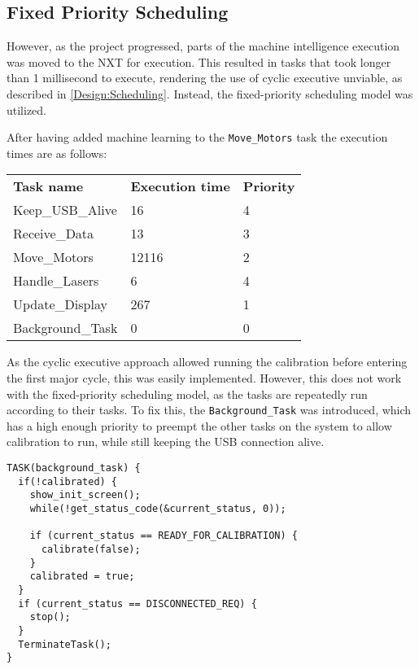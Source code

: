 \subsection{Fixed Priority Scheduling}
However, as the project progressed, parts of the machine intelligence execution was moved to the NXT for execution.
This resulted in tasks that took longer than 1 millisecond to execute, rendering the use of cyclic executive unviable, as described in \autoref{Design:Scheduling}.
Instead, the fixed-priority scheduling model was utilized.

After having added machine learning to the \texttt{Move\_Motors} task the execution times are as follows:

\begin{table}[H]
\begin{tabular}{lll}
\textbf{Task name}  & \textbf{Execution time} 	& \textbf{Priority}\\
Keep\_USB\_Alive    & 16                        & 4   \\
Receive\_Data       & 13                        & 3   \\
Move\_Motors        & 12116                     & 2   \\
Handle\_Lasers      & 6                         & 4   \\
Update\_Display     & 267                       & 1   \\
Background\_Task    & 0                         & 0   
\end{tabular}
\end{table}\label{table:executionTimes}

As the cyclic executive approach allowed running the calibration before entering the first major cycle, this was easily implemented.
However, this does not work with the fixed-priority scheduling model, as the tasks are repeatedly run according to their tasks.
To fix this, the \texttt{Background\_Task} was introduced, which has a high enough priority to preempt the other tasks on the system to allow calibration to run, while still keeping the USB connection alive.

\begin{lstlisting}[language=CSharp,label={lst:backgroundTask},caption={Background task}]
TASK(background_task) {
  if(!calibrated) {
    show_init_screen();
    while(!get_status_code(&current_status, 0));

    if (current_status == READY_FOR_CALIBRATION) {
      calibrate(false);
    }
    calibrated = true;
  }
  if (current_status == DISCONNECTED_REQ) {
    stop();
  }
  TerminateTask();
}
\end{lstlisting}

